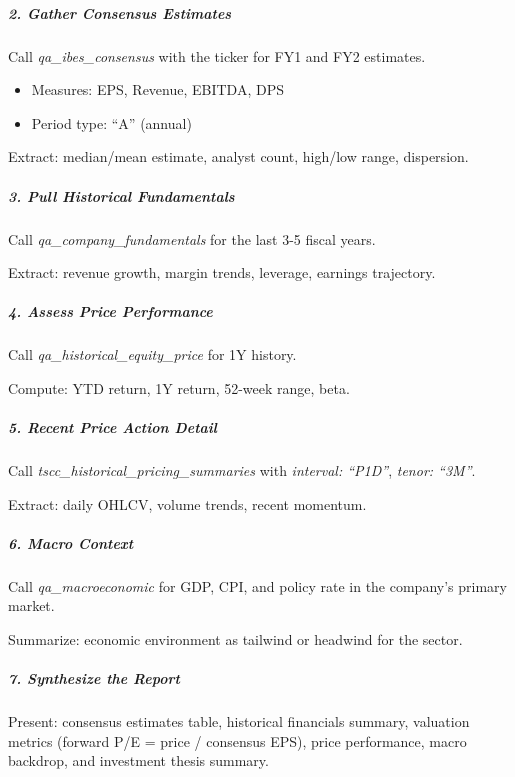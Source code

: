 \documentclass[11pt]{article}
\begin{document}
\subparagraph{2. Gather Consensus Estimates}\mbox{}\par

Call \emph{qa\_\allowbreak{}ibes\_\allowbreak{}consensus} with the ticker for FY1 and FY2 estimates.

\begin{itemize}[leftmargin=*,itemsep=2pt,topsep=2pt]
\item {} Measures: EPS, Revenue, EBITDA, DPS
\item {} Period type: ``A'' (annual)
\end{itemize}

Extract: median/mean estimate, analyst count, high/low range, dispersion.


\subparagraph{3. Pull Historical Fundamentals}\mbox{}\par

Call \emph{qa\_\allowbreak{}company\_\allowbreak{}fundamentals} for the last 3-5 fiscal years.


Extract: revenue growth, margin trends, leverage, earnings trajectory.


\subparagraph{4. Assess Price Performance}\mbox{}\par

Call \emph{qa\_\allowbreak{}historical\_\allowbreak{}equity\_\allowbreak{}price} for 1Y history.


Compute: YTD return, 1Y return, 52-week range, beta.


\subparagraph{5. Recent Price Action Detail}\mbox{}\par

Call \emph{tscc\_\allowbreak{}historical\_\allowbreak{}pricing\_\allowbreak{}summaries} with \emph{interval: ``P1D''}, \emph{tenor: ``3M''}.


Extract: daily OHLCV, volume trends, recent momentum.


\subparagraph{6. Macro Context}\mbox{}\par

Call \emph{qa\_\allowbreak{}macroeconomic} for GDP, CPI, and policy rate in the company's primary market.


Summarize: economic environment as tailwind or headwind for the sector.


\subparagraph{7. Synthesize the Report}\mbox{}\par

Present: consensus estimates table, historical financials summary, valuation metrics (forward P/E = price / consensus EPS), price performance, macro backdrop, and investment thesis summary.
\end{document}
